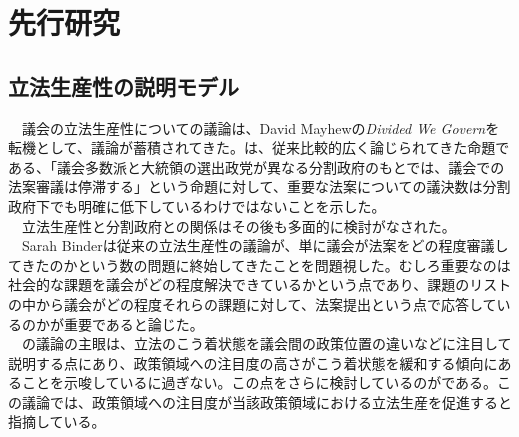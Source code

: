 \documentclass{article}
\begin{document}
\section{先行研究}
\subsection{立法生産性の説明モデル}
　議会の立法生産性についての議論は、David Mayhewの\textit{Divided We Govern}を転機として、議論が蓄積されてきた。\citet*{Mayhew1991-rq}は、従来比較的広く論じられてきた命題である、「議会多数派と大統領の選出政党が異なる分割政府のもとでは、議会での法案審議は停滞する」という命題に対して、重要な法案についての議決数は分割政府下でも明確に低下しているわけではないことを示した。\\
　立法生産性と分割政府との関係はその後も多面的に検討がなされた。\\
　Sarah Binderは従来の立法生産性の議論が、単に議会が法案をどの程度審議してきたのかという数の問題に終始してきたことを問題視した。むしろ重要なのは社会的な課題を議会がどの程度解決できているかという点であり、課題のリストの中から議会がどの程度それらの課題に対して、法案提出という点で応答しているのかが重要であると論じた。\citep*{Binder2003-bn,Binder2017-wr}\\
　\citet*{Binder2003-bn}の議論の主眼は、立法のこう着状態を議会間の政策位置の違いなどに注目して説明する点にあり、政策領域への注目度の高さがこう着状態を緩和する傾向にあることを示唆しているに過ぎない。この点をさらに検討しているのが\citet*{Adler2013-ay}である。この議論では、政策領域への注目度が当該政策領域における立法生産を促進すると指摘している。\\
\end{document}
